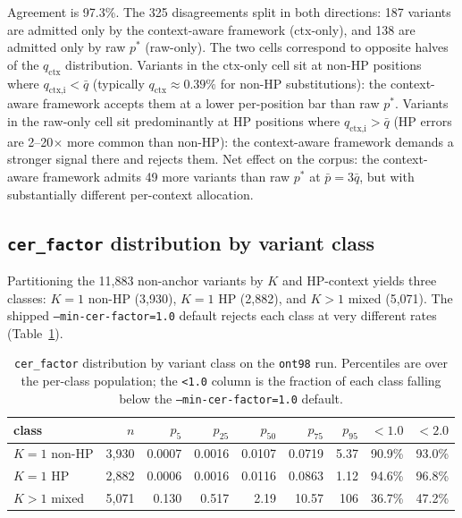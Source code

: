 \documentclass[11pt]{article}
\begin{document}
Agreement is 97.3\%. The 325 disagreements split in both directions:
187 variants are admitted only by the context-aware framework (ctx-only),
and 138 are admitted only by raw $p^*$ (raw-only). The two cells correspond
to opposite halves of the $q_\text{ctx}$ distribution. Variants in the
ctx-only cell sit at non-HP positions where $q_\text{ctx,i} < \bar{q}$
(typically $q_\text{ctx} \approx 0.39\%$ for non-HP substitutions): the
context-aware framework accepts them at a lower per-position bar than
raw $p^*$. Variants in the raw-only cell sit predominantly at HP positions
where $q_\text{ctx,i} > \bar{q}$ (HP errors are 2--20$\times$ more common
than non-HP): the context-aware framework demands a stronger signal there
and rejects them. Net effect on the corpus: the context-aware framework
admits 49 more variants than raw $p^*$ at $\bar{p} = 3\bar{q}$, but with
substantially different per-context allocation.

\subsection{\texttt{cer\_factor} distribution by variant class}
\label{sec:val_b2}

Partitioning the 11{,}883 non-anchor variants by $K$ and HP-context yields
three classes: $K{=}1$ non-HP (3{,}930), $K{=}1$ HP (2{,}882), and $K{>}1$
mixed (5{,}071). The shipped \texttt{--min-cer-factor=1.0} default rejects
each class at very different rates (Table~\ref{tab:val_distribution}).

\begin{table}[h]
\centering
\caption{\texttt{cer\_factor} distribution by variant class on the
\texttt{ont98} run. Percentiles are over the per-class population; the
\texttt{<1.0} column is the fraction of each class falling below the
\texttt{--min-cer-factor=1.0} default.}
\label{tab:val_distribution}
\small
\begin{tabular}{l r r r r r r r r}
\toprule
class       & $n$    & $p_5$   & $p_{25}$ & $p_{50}$ & $p_{75}$ & $p_{95}$ & $<\!1.0$ & $<\!2.0$ \\
\midrule
$K{=}1$ non-HP & 3{,}930 & 0.0007 & 0.0016 & 0.0107  & 0.0719 & 5.37  & 90.9\% & 93.0\% \\
$K{=}1$ HP     & 2{,}882 & 0.0006 & 0.0016 & 0.0116  & 0.0863 & 1.12  & 94.6\% & 96.8\% \\
$K{>}1$ mixed  & 5{,}071 & 0.130  & 0.517  & 2.19    & 10.57  & 106   & 36.7\% & 47.2\% \\
\bottomrule
\end{tabular}
\end{table}
\end{document}
